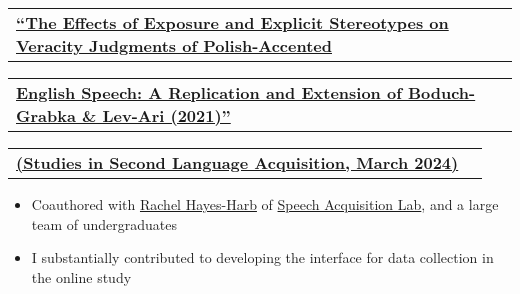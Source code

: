 \documentclass[letterpaper,11pt]{article}
\makeatletter
\newcommand{\resumeItem}[1]{
  \item{
    {#1 \vspace{-4pt}}
  }
}
\newcommand{\resumeSubheading}[4]{
  \vspace{-5pt}\item
    \begin{tabular*}{0.97\textwidth}[t]{l@{\extracolsep{\fill}}r}
      \textbf{#1} & #2 \\
    \end{tabular*}\vspace{-10pt}
}
\newcommand{\resumeItemListStart}{\begin{itemize}}
\newcommand{\resumeItemListEnd}{\end{itemize}\vspace{-5pt}}
\makeatother
\begin{document}
    \resumeSubheading
        {{\href{{https://www.cambridge.org/core/journals/studies-in-second-language-acquisition/article/effects-of-exposure-and-explicit-stereotypes-on-veracity-judgments-of-polishaccented-english-speech-a-preregistered-close-replication-and-extension-of-boduchgrabka-levari-2021/EF03B7A762B1442206B537F0AD4447A4}}{``The Effects of Exposure and Explicit Stereotypes on Veracity Judgments of Polish-Accented}}}{}{}{}
    \vspace{-9pt}
    \resumeSubheading
        {{\href{{https://www.cambridge.org/core/journals/studies-in-second-language-acquisition/article/effects-of-exposure-and-explicit-stereotypes-on-veracity-judgments-of-polishaccented-english-speech-a-preregistered-close-replication-and-extension-of-boduchgrabka-levari-2021/EF03B7A762B1442206B537F0AD4447A4}}{English Speech: A Replication and Extension of Boduch-Grabka \& Lev-Ari (2021)''}}}{}{}{}
    \vspace{-9pt}
        \resumeSubheading
            {{\href{{https://www.cambridge.org/core/journals/studies-in-second-language-acquisition/article/effects-of-exposure-and-explicit-stereotypes-on-veracity-judgments-of-polishaccented-english-speech-a-preregistered-close-replication-and-extension-of-boduchgrabka-levari-2021/EF03B7A762B1442206B537F0AD4447A4}}{(Studies in Second Language Acquisition, March 2024)}}}{}{}{}
        \resumeItemListStart\small
             \resumeItem{Coauthored with \href{{https://sites.google.com/view/speech-acquisition-lab/rachel-hayes-harb}}{Rachel Hayes-Harb} of \href{{https://sites.google.com/view/speech-acquisition-lab/}}{Speech Acquisition Lab}, and a large team of undergraduates}
            \resumeItem{I substantially contributed to developing the interface for data collection in the online study}
        \resumeItemListEnd

    
\end{document}
